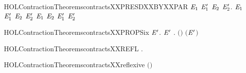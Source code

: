 \newcommand{\HOLContractionTheoremscontractsXXPRESDXXBYXXGUARDEDXXSUM}{\UseVerbatim{HOLContractionTheoremscontractsXXPRESDXXBYXXGUARDEDXXSUM}}
\begin{SaveVerbatim}{HOLContractionTheoremscontractsXXPRESDXXBYXXPAR}
\HOLTokenTurnstile{} \HOLSymConst{\HOLTokenForall{}}\ensuremath{\HOLBoundVar{E}\sb{\mathrm{1}}} \ensuremath{\HOLBoundVar{E}\sb{\mathrm{1}}\sp{\prime{}}} \ensuremath{\HOLBoundVar{E}\sb{\mathrm{2}}} \ensuremath{\HOLBoundVar{E}\sb{\mathrm{2}}\sp{\prime{}}}.
     \ensuremath{\HOLBoundVar{E}\sb{\mathrm{1}}}  \ensuremath{\HOLBoundVar{E}\sb{\mathrm{1}}\sp{\prime{}}} \HOLSymConst{\HOLTokenConj{}} \ensuremath{\HOLBoundVar{E}\sb{\mathrm{2}}}  \ensuremath{\HOLBoundVar{E}\sb{\mathrm{2}}\sp{\prime{}}} \HOLSymConst{\HOLTokenImp{}}
     \ensuremath{\HOLBoundVar{E}\sb{\mathrm{1}}} \HOLSymConst{\ensuremath{\mid}} \ensuremath{\HOLBoundVar{E}\sb{\mathrm{2}}}  \ensuremath{\HOLBoundVar{E}\sb{\mathrm{1}}\sp{\prime{}}} \HOLSymConst{\ensuremath{\mid}} \ensuremath{\HOLBoundVar{E}\sb{\mathrm{2}}\sp{\prime{}}}
\end{SaveVerbatim}
\newcommand{\HOLContractionTheoremscontractsXXPRESDXXBYXXPAR}{\UseVerbatim{HOLContractionTheoremscontractsXXPRESDXXBYXXPAR}}
\begin{SaveVerbatim}{HOLContractionTheoremscontractsXXPROPSix}
\HOLTokenTurnstile{} \HOLSymConst{\HOLTokenForall{}} \ensuremath{\HOLBoundVar{E}\sp{\prime{}}}.   \ensuremath{\HOLBoundVar{E}\sp{\prime{}}} \HOLSymConst{\HOLTokenImp{}} \HOLSymConst{\HOLTokenForall{}}.  \ensuremath{(}\HOLSymConst{\ensuremath{\ldotp}}\ensuremath{)} \ensuremath{(}\HOLSymConst{\ensuremath{\ldotp}}\ensuremath{\HOLBoundVar{E}\sp{\prime{}}}\ensuremath{)}
\end{SaveVerbatim}
\newcommand{\HOLContractionTheoremscontractsXXPROPSix}{\UseVerbatim{HOLContractionTheoremscontractsXXPROPSix}}
\begin{SaveVerbatim}{HOLContractionTheoremscontractsXXREFL}
\HOLTokenTurnstile{} \HOLSymConst{\HOLTokenForall{}}.   
\end{SaveVerbatim}
\newcommand{\HOLContractionTheoremscontractsXXREFL}{\UseVerbatim{HOLContractionTheoremscontractsXXREFL}}
\begin{SaveVerbatim}{HOLContractionTheoremscontractsXXreflexive}
\HOLTokenTurnstile{}  \ensuremath{(}\ensuremath{)}
\end{SaveVerbatim}
